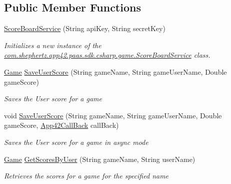 \subsection*{Public Member Functions}
\begin{DoxyCompactItemize}
\item 
\hyperlink{classcom_1_1shephertz_1_1app42_1_1paas_1_1sdk_1_1csharp_1_1game_1_1_score_board_service_ad1869cbe096ab345b87cdf41431741b1}{Score\+Board\+Service} (String api\+Key, String secret\+Key)
\begin{DoxyCompactList}\small\item\em Initializes a new instance of the \hyperlink{classcom_1_1shephertz_1_1app42_1_1paas_1_1sdk_1_1csharp_1_1game_1_1_score_board_service}{com.\+shephertz.\+app42.\+paas.\+sdk.\+csharp.\+game.\+Score\+Board\+Service} class. \end{DoxyCompactList}\item 
\hyperlink{classcom_1_1shephertz_1_1app42_1_1paas_1_1sdk_1_1csharp_1_1game_1_1_game}{Game} \hyperlink{classcom_1_1shephertz_1_1app42_1_1paas_1_1sdk_1_1csharp_1_1game_1_1_score_board_service_a90014b36f31566f25ea8f0e3a54540da}{Save\+User\+Score} (String game\+Name, String game\+User\+Name, Double game\+Score)
\begin{DoxyCompactList}\small\item\em Saves the User score for a game \end{DoxyCompactList}\item 
void \hyperlink{classcom_1_1shephertz_1_1app42_1_1paas_1_1sdk_1_1csharp_1_1game_1_1_score_board_service_aa85d3840e36bb55a6b5f71cc57c03396}{Save\+User\+Score} (String game\+Name, String game\+User\+Name, Double game\+Score, \hyperlink{interfacecom_1_1shephertz_1_1app42_1_1paas_1_1sdk_1_1csharp_1_1_app42_call_back}{App42\+Call\+Back} call\+Back)
\begin{DoxyCompactList}\small\item\em Saves the User score for a game in async mode \end{DoxyCompactList}\item 
\hyperlink{classcom_1_1shephertz_1_1app42_1_1paas_1_1sdk_1_1csharp_1_1game_1_1_game}{Game} \hyperlink{classcom_1_1shephertz_1_1app42_1_1paas_1_1sdk_1_1csharp_1_1game_1_1_score_board_service_ad3ff880a394654793e5725ea04a0d8d8}{Get\+Scores\+By\+User} (String game\+Name, String user\+Name)
\begin{DoxyCompactList}\small\item\em Retrieves the scores for a game for the specified name \end{DoxyCompactList}\item 

\end{DoxyCompactItemize}
